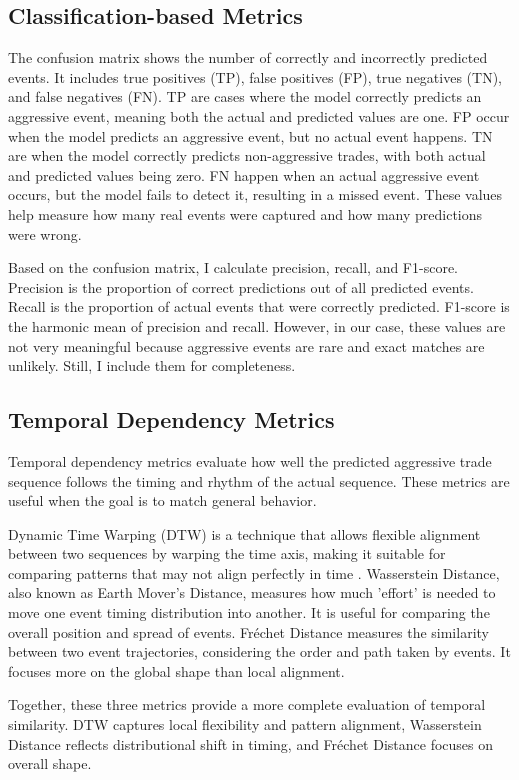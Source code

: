 \subsection{Classification-based Metrics}
The confusion matrix shows the number of correctly and incorrectly predicted events. It includes true positives (TP), false positives (FP), true negatives (TN), and false negatives (FN). TP are cases where the model correctly predicts an aggressive event, meaning both the actual and predicted values are one. FP occur when the model predicts an aggressive event, but no actual event happens. TN are when the model correctly predicts non-aggressive trades, with both actual and predicted values being zero. FN happen when an actual aggressive event occurs, but the model fails to detect it, resulting in a missed event. These values help measure how many real events were captured and how many predictions were wrong.

Based on the confusion matrix, I calculate precision, recall, and F1-score. Precision is the proportion of correct predictions out of all predicted events. Recall is the proportion of actual events that were correctly predicted. F1-score is the harmonic mean of precision and recall. However, in our case, these values are not very meaningful because aggressive events are rare and exact matches are unlikely. Still, I include them for completeness.

\subsection{Temporal Dependency Metrics}
Temporal dependency metrics evaluate how well the predicted aggressive trade sequence follows the timing and rhythm of the actual sequence. These metrics are useful when the goal is to match general behavior.

Dynamic Time Warping (DTW) is a technique that allows flexible alignment between two sequences by warping the time axis, making it suitable for comparing patterns that may not align perfectly in time \citep{muller2007dtw}. Wasserstein Distance, also known as Earth Mover's Distance, measures how much 'effort' is needed to move one event timing distribution into another. It is useful for comparing the overall position and spread of events. Fréchet Distance measures the similarity between two event trajectories, considering the order and path taken by events. It focuses more on the global shape than local alignment.

Together, these three metrics provide a more complete evaluation of temporal similarity. DTW captures local flexibility and pattern alignment, Wasserstein Distance reflects distributional shift in timing, and Fréchet Distance focuses on overall shape.

